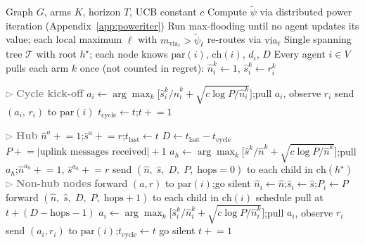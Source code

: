 \documentclass{article}
\newcommand{\merw}{EigenTree}
\begin{document}
\begin{algorithm}[H]
\caption{\merw}
\label{alg:merw}
\begin{algorithmic}[1]
\Require Graph $G$, arms $K$, horizon $T$, UCB constant $c$
\State Compute $\tilde{\psi}$ via distributed power iteration (Appendix~\ref{app:poweriter})
\State Run max-flooding until no agent updates its value; each local maximum $\ell$ with $m_{\mathrm{via}_\ell} > \tilde{\psi}_\ell$ re-routes via $\mathrm{via}_\ell$
\State Single spanning tree $\mathcal{T}$ with root $h^\star$; each node knows $\mathrm{par}(i)$, $\mathrm{ch}(i)$, $d_i$, $D$
\State Every agent $i \in V$ pulls each arm $k$ once (not counted in regret): $\hat{n}_i^k \leftarrow 1$, $\hat{s}_i^k \leftarrow r_i^k$

\State \textcolor{gray}{$\triangleright$ \textbf{Cycle kick-off}}
    \State $a_i \leftarrow \arg\max_k \bigl[\hat{s}_i^k/\hat{n}_i^k + \sqrt{c\log P/\hat{n}_i^k}\bigr]$;\quad pull $a_i$, observe $r_i$
\EndFor
{} send $(a_i,\, r_i)$ to $\mathrm{par}(i)$ \EndFor
\State $t_{\mathrm{cycle}} \leftarrow t$;\quad $t \mathrel{+}= 1$

    \State \textcolor{gray}{$\triangleright$ \textbf{Hub}}
        \State $\hat{n}^a \mathrel{+}= 1$;\quad $\hat{s}^a \mathrel{+}= r$;\quad $t_{\mathrm{last}} \leftarrow t$
    \EndIf
        \State $D \leftarrow t_{\mathrm{last}} - t_{\mathrm{cycle}}$
        \State $P \mathrel{+}= |\text{uplink messages received}| + 1$ 
        \State $a_h \leftarrow \arg\max_k \bigl[\hat{s}^k/\hat{n}^k + \sqrt{c\log P/\hat{n}^k}\bigr]$;\quad pull $a_h$;\quad $\hat{n}^{a_h} \mathrel{+}= 1$, $\hat{s}^{a_h} \mathrel{+}= r$
        \State send $(\hat{n},\; \hat{s},\; D,\; P,\; \mathrm{hops}{=}0)$ to each child in $\mathrm{ch}(h^\star)$
    \EndIf
    \State \textcolor{gray}{$\triangleright$ \textbf{Non-hub nodes}}
            \State forward $(a, r)$ to $\mathrm{par}(i)$;\quad go silent
            \State $\hat{n}_i \leftarrow \hat{n}$;\quad $\hat{s}_i \leftarrow \hat{s}$;\quad $P_i \leftarrow P$
            \State forward $(\hat{n},\; \hat{s},\; D,\; P,\; \mathrm{hops}{+}1)$ to each child in $\mathrm{ch}(i)$
            \State schedule pull at $t + (D - \mathrm{hops} - 1)$
            \State $a_i \leftarrow \arg\max_k \bigl[\hat{s}_i^k/\hat{n}_i^k + \sqrt{c\log P/\hat{n}_i^k}\bigr]$;\quad pull $a_i$, observe $r_i$
            \State send $(a_i, r_i)$ to $\mathrm{par}(i)$;\quad $t_{\mathrm{cycle}} \leftarrow t$
        \Else
            \State go silent
        \EndIf
    \EndFor
    \State $t \mathrel{+}= 1$
\EndWhile
\end{algorithmic}
\end{algorithm}
\end{document}
